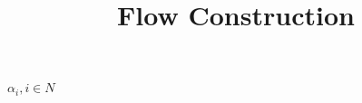 \documentclass[10pts, a4paper]{article}
\title{ \begin{large}
\textbf{Flow Construction}
\end{large} 
}
\date{}
\begin{document}
\thispagestyle{empty}
$\alpha_i, i\in N$
\end{document}
